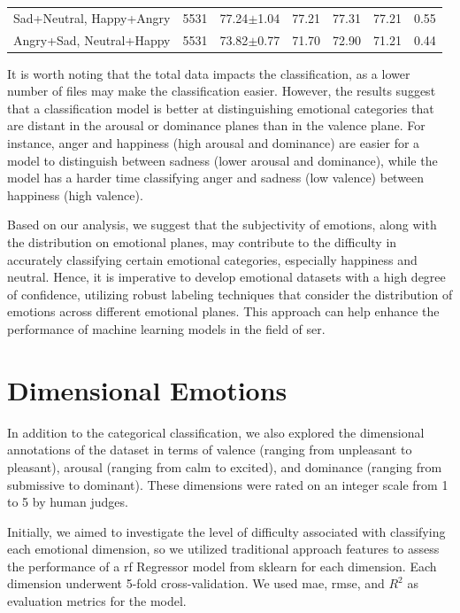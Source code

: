 \begin{table}[H]
{\begin{tabular}{lrrrrrr}
			\addlinespace[2mm]
			
			Sad+Neutral, Happy+Angry  &         5531 & 77.24$\pm$1.04 & 77.21 & 77.31 &	77.21 & 0.55 \\
			Angry+Sad, Neutral+Happy  &         5531 & 73.82$\pm$0.77 &	71.70 & 72.90 & 71.21 & 0.44 \\
			
			\bottomrule
		\end{tabular}%
	}
\end{table}


It is worth noting that the total data impacts the classification, as a lower number of files may make the classification easier. However, the results suggest that a classification model is better at distinguishing emotional categories that are distant in the arousal or dominance planes than in the valence plane. For instance, anger and happiness (high arousal and dominance) are easier for a model to distinguish between sadness (lower arousal and dominance), while the model has a harder time classifying anger and sadness (low valence) between happiness (high valence).

Based on our analysis, we suggest that the subjectivity of emotions, along with the distribution on emotional planes, may contribute to the difficulty in accurately classifying certain emotional categories, especially happiness and neutral. Hence, it is imperative to develop emotional datasets with a high degree of confidence, utilizing robust labeling techniques that consider the distribution of emotions across different emotional planes. This approach can help enhance the performance of machine learning models in the field of \ac{ser}.


\section{Dimensional Emotions}

In addition to the categorical classification, we also explored the dimensional annotations of the dataset in terms of valence (ranging from unpleasant to pleasant), arousal (ranging from calm to excited), and dominance (ranging from submissive to dominant). These dimensions were rated on an integer scale from 1 to 5 by human judges.

Initially, we aimed to investigate the level of difficulty associated with classifying each emotional dimension, so we utilized traditional approach features to assess the performance of a \ac{rf} Regressor model from sklearn for each dimension. Each dimension underwent 5-fold cross-validation. We used \ac{mae}, \ac{rmse}, and $R^2$ as evaluation metrics for the model.

